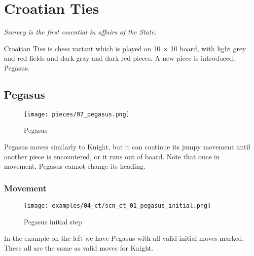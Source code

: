 

\chapter*{Croatian Ties}
\label{ch:Croatian Ties}

\begin{flushright}
\parbox{0.7\textwidth}{
\emph{Secrecy is the first essential in affairs of the State.\newline
{} } }
\end{flushright}

\noindent
Croatian Ties is chess variant which is played on 10 $\times$ 10 board,
with light grey and red fields and dark gray and dark red pieces.
A new piece is introduced, Pegasus.

\clearpage %

\section*{Pegasus}
\label{sec:Croatian Ties/Pegasus}

\noindent
\begin{wrapfigure}[6]{l}{0.4\textwidth}
\centering
\texttt{[image: pieces/07\_pegasus.png]}
\caption{Pegasus}
\label{fig:07_pegasus}
\end{wrapfigure}
Pegasus moves similarly to Knight, but it can continue its jumpy movement
until another piece is encountered, or it runs out of board. Note that once
in movement, Pegasus cannot change its heading.

\vspace{5.0\baselineskip}
\subsection*{Movement}
\label{sec:Croatian Ties/Pegasus/Movement}

\noindent
\begin{wrapfigure}[15]{l}{0.5\textwidth}
\centering
\texttt{[image: examples/04\_ct/scn\_ct\_01\_pegasus\_initial.png]}
\caption{Pegasus initial step}
\label{fig:scn_ct_01_pegasus_initial}
\end{wrapfigure}
In the example on the left we have Pegasus with all valid initial moves marked.
These all are the same as valid moves for Knight.

